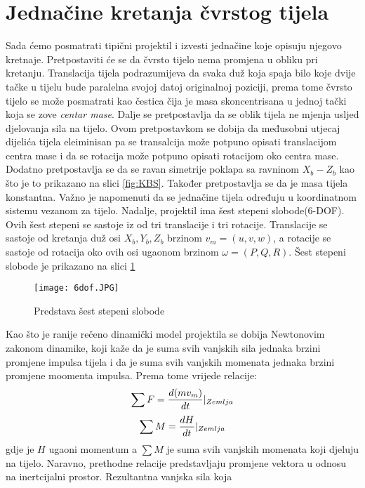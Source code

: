 \section{Jednačine kretanja čvrstog tijela}
Sada ćemo posmatrati tipični projektil i izvesti jednačine koje opisuju njegovo kretnaje.
Pretpostaviti će se da čvrsto tijelo nema promjena u obliku pri kretanju. Translacija tijela 
podrazumijeva da svaka duž koja spaja bilo koje dvije tačke u tijelu bude paralelna svojoj
datoj originalnoj poziciji, prema tome čvrsto tijelo se može posmatrati kao čestica čija je 
masa skoncentrisana u jednoj tački koja se zove \textit{centar mase}. Dalje se pretpostavlja 
da se oblik tijela ne mjenja usljed djelovanja sila na tijelo. Ovom pretpostavkom se 
dobija da međusobni utjecaj dijelića tijela eleiminisan pa se transalcija može potpuno opisati
translacijom centra mase i da se rotacija može potpuno opisati rotacijom oko centra mase. Dodatno 
pretpostavlja se da se ravan simetrije poklapa sa ravninom $X_b - Z_b$ kao što je to prikazano na 
slici \ref{fig:KBS}. Također pretpostavlja se da je masa tijela konstantna. Važno je 
napomenuti da se jednačine tijela određuju u koordinatnom sistemu vezanom za tijelo. 
Nadalje, projektil ima šest stepeni slobode(6-DOF). Ovih šest stepeni se sastoje iz od tri translacije i 
tri rotacije. Translacije se sastoje od kretanja duž osi $X_b,Y_b,Z_b$ brzinom $v_m=(u,v,w)$, a rotacije se sastoje 
od rotacija oko ovih osi ugaonom brzinom $\omega = (P,Q,R)$. Šest stepeni slobode je prikazano
na slici \ref{fig:dof} 
\begin{figure}
    \centering
    \texttt{[image: 6dof.JPG]}
    \caption{Predstava šest stepeni slobode}
    \label{fig:dof}
\end{figure}
Kao što je ranije rečeno dinamički model projektila se dobija Newtonovim zakonom dinamike,
koji kaže da je suma svih vanjskih sila jednaka brzini promjene impulsa tijela i da je 
suma svih vanjskih momenata jednaka brzini promjene moomenta impulsa. Prema tome vrijede relacije:
\begin{equation}
    \sum F=\frac{d(mv_m)}{dt}{\Huge|}_{Zemlja}
    \label{eq:f}
\end{equation}
\begin{equation}
    \sum M=\frac{dH}{dt}{\Huge|}_{Zemlja}
    \label{eq:m}
\end{equation}
gdje je $H$ ugaoni momentum a $\sum M$ je suma svih vanjskih momenata koji djeluju na tijelo. Naravno, prethodne 
relacije predstavljaju promjene vektora u odnosu na inertcijalni prostor. Rezultantna vanjska sila koja 
